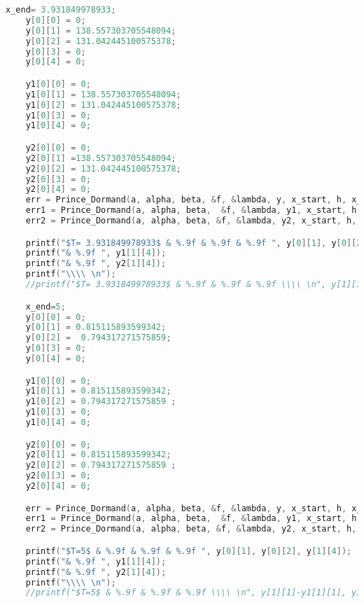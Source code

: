 \documentclass{article}
\theoremstyle{remark}
\theoremstyle{definition}
\begin{document}
\begin{lstlisting}[language=C]
    x_end= 3.931849978933;
    y[0][0] = 0;
    y[0][1] = 138.557303705548094;
    y[0][2] = 131.042445100575378;
    y[0][3] = 0;
    y[0][4] = 0;

    y1[0][0] = 0;
    y1[0][1] = 138.557303705548094;
    y1[0][2] = 131.042445100575378;
    y1[0][3] = 0;
    y1[0][4] = 0;

    y2[0][0] = 0;
    y2[0][1] =138.557303705548094;
    y2[0][2] = 131.042445100575378;
    y2[0][3] = 0;
    y2[0][4] = 0;
    err = Prince_Dormand(a, alpha, beta, &f, &lambda, y, x_start, h, x_end, &h_next, eps);
    err1 = Prince_Dormand(a, alpha, beta,  &f, &lambda, y1, x_start, h, x_end, &h_next, eps*1e-2);
    err2 = Prince_Dormand(a, alpha, beta, &f, &lambda, y2, x_start, h, x_end, &h_next, eps*1e-4);

    printf("$T= 3.931849978933$ & %.9f & %.9f & %.9f ", y[0][1], y[0][2], y[1][4]);
    printf("& %.9f ", y1[1][4]);
    printf("& %.9f ", y2[1][4]);
    printf("\\\\ \n");
    //printf("$T= 3.931849978933$ & %.9f & %.9f & %.9f \\\\ \n", y[1][1]-y1[1][1], y1[1][1]-y2[1][1], (y[1][1]-y1[1][1])/(y1[1][1]-y2[1][1]));

    x_end=5;
    y[0][0] = 0;
    y[0][1] = 0.815115893599342;
    y[0][2] =  0.794317271575859;
    y[0][3] = 0;
    y[0][4] = 0;

    y1[0][0] = 0;
    y1[0][1] = 0.815115893599342;
    y1[0][2] = 0.794317271575859 ;
    y1[0][3] = 0;
    y1[0][4] = 0;

    y2[0][0] = 0;
    y2[0][1] = 0.815115893599342;
    y2[0][2] = 0.794317271575859 ;
    y2[0][3] = 0;
    y2[0][4] = 0;

    err = Prince_Dormand(a, alpha, beta, &f, &lambda, y, x_start, h, x_end, &h_next, eps);
    err1 = Prince_Dormand(a, alpha, beta,  &f, &lambda, y1, x_start, h, x_end, &h_next, eps*1e-2);
    err2 = Prince_Dormand(a, alpha, beta, &f, &lambda, y2, x_start, h, x_end, &h_next, eps*1e-4);

    printf("$T=5$ & %.9f & %.9f & %.9f ", y[0][1], y[0][2], y[1][4]);
    printf("& %.9f ", y1[1][4]);
    printf("& %.9f ", y2[1][4]);
    printf("\\\\ \n");
    //printf("$T=5$ & %.9f & %.9f & %.9f \\\\ \n", y[1][1]-y1[1][1], y1[1][1]-y2[1][1], (y[1][1]-y1[1][1])/(y1[1][1]-y2[1][1]));



\end{lstlisting}
\end{document}

